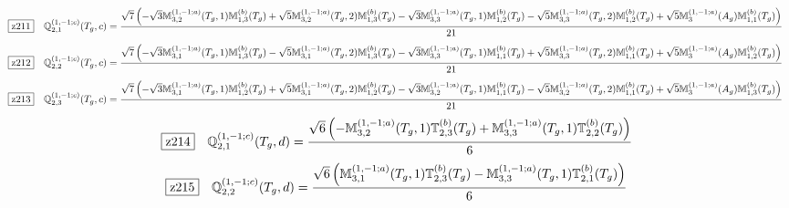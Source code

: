 \documentclass[fleqn,10pt,landscape]{jsarticle}
\begin{document}
\begin{dmath*}
\hspace*{3mm}\fbox{z211}\quad \mathbb{Q}_{2,1}^{(1,-1;c)}(T_{g},c)=\frac{\sqrt{7} \left(- \sqrt{3} \mathbb{M}_{3,2}^{(1,-1;a)}(T_{g},1) \mathbb{M}_{1,3}^{(b)}(T_{g}) + \sqrt{5} \mathbb{M}_{3,2}^{(1,-1;a)}(T_{g},2) \mathbb{M}_{1,3}^{(b)}(T_{g}) - \sqrt{3} \mathbb{M}_{3,3}^{(1,-1;a)}(T_{g},1) \mathbb{M}_{1,2}^{(b)}(T_{g}) - \sqrt{5} \mathbb{M}_{3,3}^{(1,-1;a)}(T_{g},2) \mathbb{M}_{1,2}^{(b)}(T_{g}) + \sqrt{5} \mathbb{M}_{3}^{(1,-1;a)}(A_{g}) \mathbb{M}_{1,1}^{(b)}(T_{g})\right)}{21}
\end{dmath*}
\begin{dmath*}
\hspace*{3mm}\fbox{z212}\quad \mathbb{Q}_{2,2}^{(1,-1;c)}(T_{g},c)=\frac{\sqrt{7} \left(- \sqrt{3} \mathbb{M}_{3,1}^{(1,-1;a)}(T_{g},1) \mathbb{M}_{1,3}^{(b)}(T_{g}) - \sqrt{5} \mathbb{M}_{3,1}^{(1,-1;a)}(T_{g},2) \mathbb{M}_{1,3}^{(b)}(T_{g}) - \sqrt{3} \mathbb{M}_{3,3}^{(1,-1;a)}(T_{g},1) \mathbb{M}_{1,1}^{(b)}(T_{g}) + \sqrt{5} \mathbb{M}_{3,3}^{(1,-1;a)}(T_{g},2) \mathbb{M}_{1,1}^{(b)}(T_{g}) + \sqrt{5} \mathbb{M}_{3}^{(1,-1;a)}(A_{g}) \mathbb{M}_{1,2}^{(b)}(T_{g})\right)}{21}
\end{dmath*}
\begin{dmath*}
\hspace*{3mm}\fbox{z213}\quad \mathbb{Q}_{2,3}^{(1,-1;c)}(T_{g},c)=\frac{\sqrt{7} \left(- \sqrt{3} \mathbb{M}_{3,1}^{(1,-1;a)}(T_{g},1) \mathbb{M}_{1,2}^{(b)}(T_{g}) + \sqrt{5} \mathbb{M}_{3,1}^{(1,-1;a)}(T_{g},2) \mathbb{M}_{1,2}^{(b)}(T_{g}) - \sqrt{3} \mathbb{M}_{3,2}^{(1,-1;a)}(T_{g},1) \mathbb{M}_{1,1}^{(b)}(T_{g}) - \sqrt{5} \mathbb{M}_{3,2}^{(1,-1;a)}(T_{g},2) \mathbb{M}_{1,1}^{(b)}(T_{g}) + \sqrt{5} \mathbb{M}_{3}^{(1,-1;a)}(A_{g}) \mathbb{M}_{1,3}^{(b)}(T_{g})\right)}{21}
\end{dmath*}
\begin{dmath*}
\hspace*{3mm}\fbox{z214}\quad \mathbb{Q}_{2,1}^{(1,-1;c)}(T_{g},d)=\frac{\sqrt{6} \left(- \mathbb{M}_{3,2}^{(1,-1;a)}(T_{g},1) \mathbb{T}_{2,3}^{(b)}(T_{g}) + \mathbb{M}_{3,3}^{(1,-1;a)}(T_{g},1) \mathbb{T}_{2,2}^{(b)}(T_{g})\right)}{6}
\end{dmath*}
\begin{dmath*}
\hspace*{3mm}\fbox{z215}\quad \mathbb{Q}_{2,2}^{(1,-1;c)}(T_{g},d)=\frac{\sqrt{6} \left(\mathbb{M}_{3,1}^{(1,-1;a)}(T_{g},1) \mathbb{T}_{2,3}^{(b)}(T_{g}) - \mathbb{M}_{3,3}^{(1,-1;a)}(T_{g},1) \mathbb{T}_{2,1}^{(b)}(T_{g})\right)}{6}
\end{dmath*}
\end{document}
